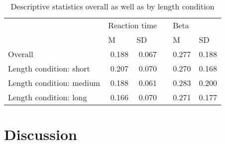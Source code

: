 \documentclass[man,floatsintext]{apa6} %
\begin{document}
\begin{table}[ht]
  \caption{Descriptive statistics overall as well as by length condition}
  \centering
  \begin{tabular}{lrrrrr}
    \toprule
                              & \multicolumn{2}{l}{Reaction time}              && \multicolumn{2}{l}{Beta}                       \\ \cmidrule{2-3} \cmidrule{5-6}
                              & \multicolumn{1}{l}{M} & \multicolumn{1}{l}{SD} && \multicolumn{1}{l}{M} & \multicolumn{1}{l}{SD} \\
    \midrule
    Overall                   & 0.188                 &  0.067                 && 0.277                 & 0.188                  \\
    Length condition: short   & 0.207                 &  0.070                 && 0.270                 & 0.168                  \\
    Length condition: medium  & 0.188                 &  0.061                 && 0.283                 & 0.200                  \\
    Length condition: long    & 0.166                 &  0.070                 && 0.271                 & 0.177                  \\
    \bottomrule
  \end{tabular}
\end{table}

\section{Discussion}



\end{document}
